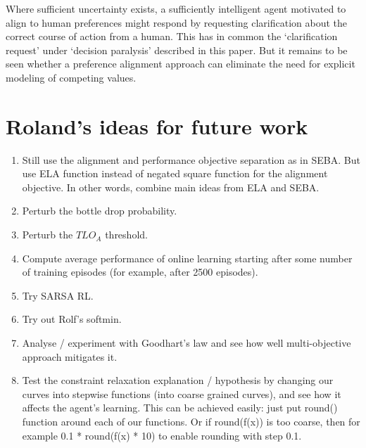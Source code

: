 Where sufficient uncertainty exists, a sufficiently intelligent agent motivated to align to human preferences might respond by requesting clarification about the correct course of action from a human. This has in common the `clarification request' under `decision paralysis' described in this paper. But it remains to be seen whether a preference alignment approach can eliminate the need for explicit modeling of competing values.

\section{Roland's ideas for future work}

\begin{enumerate}
    \item Still use the alignment and performance objective separation as in SEBA. But use ELA function instead of negated square function for the alignment objective. In other words, combine main ideas from ELA and SEBA.
    \item Perturb the bottle drop probability.
    \item Perturb the $TLO_A$ threshold.
    \item Compute average performance of online learning starting after some number of training episodes (for example, after 2500 episodes).
    \item Try SARSA RL.
    \item Try out Rolf's softmin.
    \item Analyse / experiment with Goodhart's law and see how well multi-objective approach mitigates it.
    \item Test the constraint relaxation explanation / hypothesis by changing our curves into stepwise functions (into coarse grained curves), and see how it affects the agent's learning. This can be achieved easily: just put round() function around each of our functions. Or if round(f(x)) is too coarse, then for example 0.1 * round(f(x) * 10) to enable rounding with step 0.1.
\end{enumerate}